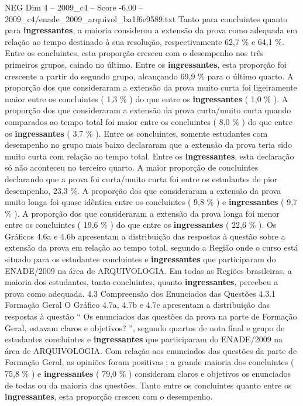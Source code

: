 \begin{textsample}{NEG Dim 4 – 2009\_c4 – Score -6.00 – 2009\_c4/enade\_2009\_arquivol\_ba1f6e9589.txt}
Tanto para concluintes quanto para \textbf{ingressantes}, a maioria considerou a extensão da prova como adequada em relação ao tempo destinado à sua resolução, respectivamente 62,7 \% e 64,1 \%.
Entre os concluintes, esta proporção cresceu com o desempenho nos três primeiros grupos, caindo no último.
Entre os \textbf{ingressantes}, esta proporção foi crescente a partir do segundo grupo, alcançando 69,9 \% para o último quarto.
A proporção dos que consideraram a extensão da prova muito curta foi ligeiramente maior entre os concluintes ( 1,3 \% ) do que entre os \textbf{ingressantes} ( 1,0 \% ).
A proporção dos que consideraram a extensão da prova curta/muito curta quando comparados ao tempo total foi maior entre os concluintes ( 8,0 \% ) do que entre os \textbf{ingressantes} ( 3,7 \% ).
Entre os concluintes, somente estudantes com desempenho no grupo mais baixo declararam que a extensão da prova teria sido muito curta com relação ao tempo total.
Entre os \textbf{ingressantes}, esta declaração só não aconteceu no terceiro quarto.
A maior proporção de concluintes declarando que a prova foi curta/muito curta foi entre os estudantes de pior desempenho, 23,3 \%.
A proporção dos que consideraram a extensão da prova muito longa foi quase idêntica entre os concluintes ( 9,8 \% ) e \textbf{ingressantes} ( 9,7 \% ).
A proporção dos que consideraram a extensão da prova longa foi menor entre os concluintes ( 19,6 \% ) do que entre os \textbf{ingressantes} ( 22,6 \% ).
Os Gráficos 4.6a e 4.6b apresentam a distribuição das respostas à questão sobre a extensão da prova em relação ao tempo total, segundo a Região onde o curso está situado para os estudantes concluintes e \textbf{ingressantes} que participaram do ENADE/2009 na área de ARQUIVOLOGIA.
Em todas as Regiões brasileiras, a maioria dos estudantes, tanto concluintes, quanto \textbf{ingressantes}, percebeu a prova como adequada. 4.3 Compreensão dos Enunciados das Questões 4.3.1 Formação Geral O Gráfico 4.7a, 4.7b e 4.7c apresentam a distribuição das respostas à questão “ Os enunciados das questões da prova na parte de Formação Geral, estavam claros e objetivos? ”, segundo quartos de nota final e grupo de estudantes concluintes e \textbf{ingressantes} que participaram do ENADE/2009 na área de ARQUIVOLOGIA.
Com relação aos enunciados das questões da parte de Formação Geral, as opiniões foram positivas : a grande maioria dos concluintes ( 75,8 \% ) e \textbf{ingressantes} ( 79,0 \% ) consideram claros e objetivos os enunciados de todas ou da maioria das questões.
Tanto entre os concluintes quanto entre os \textbf{ingressantes}, esta proporção cresceu com o desempenho.

\end{textsample}
